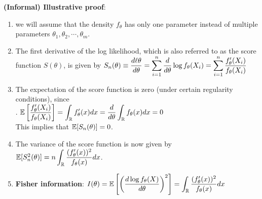 \vspace{0.5cm}
\textbf{(Informal) Illustrative proof}:
\begin{enumerate}
    \item we will assume that the density $f_{\theta}$ has only one parameter instead of multiple parameters $\theta_1 , \theta_2, \cdots , \theta_m $.
    \hfill \cite{statistics/book/Statistics-for-Data-Scientists/Maurits-Kaptein}

    \item The first derivative of the log likelihood, which is also referred to as the score function $S(\theta)$, is given by
    $
        S_n (\theta )
        \equiv \dfrac{d\ell\theta }{d\theta}
        = \displaystyle\sum^n _{i=1} \dfrac{d} {d\theta}  \log f_\theta  (X_i )
        = \displaystyle\sum^n _{i=1} \dfrac{f^\prime_\theta  (X_i ) }{f_{\theta}  (X_i )}
    $
    \hfill \cite{statistics/book/Statistics-for-Data-Scientists/Maurits-Kaptein}

    \item The expectation of the score function is zero (under certain regularity conditions), since
    \hfill \cite{statistics/book/Statistics-for-Data-Scientists/Maurits-Kaptein}
    \\[0.2cm]
    .\hfill
    $
        \mathbb{E}\left[\dfrac{f ^\prime _\theta  (X_i )}{f_\theta  (X_i )}\right]
        = \displaystyle\int _{\mathbb{R}} f ^\prime _\theta  (x)dx
        = \dfrac{d} {d\theta}  \displaystyle\int _{\mathbb{R}} f_\theta  (x)dx
        = 0
    $
    \hfill \cite{statistics/book/Statistics-for-Data-Scientists/Maurits-Kaptein}
    \\[0.2cm]
    This implies that $\mathbb{E}[S_n (\theta)] = 0$.
    \hfill \cite{statistics/book/Statistics-for-Data-Scientists/Maurits-Kaptein}

    \item The variance of the score function is now given by $\mathbb{E}[S^2 _n (\theta )] = n \displaystyle\int _{\mathbb{R}}\dfrac{( f ^\prime _\theta  (x))^2}{f_\theta  (x)}dx$.
    \hfill \cite{statistics/book/Statistics-for-Data-Scientists/Maurits-Kaptein}

    \item \textbf{Fisher information}:
    $
        I (\theta )
        = \mathbb{E} \left[\left(\dfrac{d \log f_\theta  (X)}{d\theta }\right)^2 \right]
        = \displaystyle\int _{\mathbb{R}} \dfrac{( f ^\prime _\theta  (x))^2}{ f_\theta  (x)} dx
    $
    \hfill \cite{statistics/book/Statistics-for-Data-Scientists/Maurits-Kaptein}


\end{enumerate}
